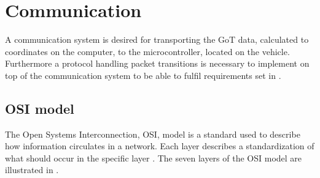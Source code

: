 \chapter{Communication}
A communication system is desired for transporting the GoT data, calculated to coordinates on the computer, to the microcontroller, located on the vehicle. Furthermore a protocol handling packet transitions is necessary to implement on top of the communication system to be able to fulfil requirements set in .

\section{OSI model}
The Open Systems Interconnection, OSI, model is a standard used to describe how information circulates in a network. Each layer describes a standardization of what should occur in the specific layer \cite{Microsoft}. The seven layers of the OSI model are illustrated in .

